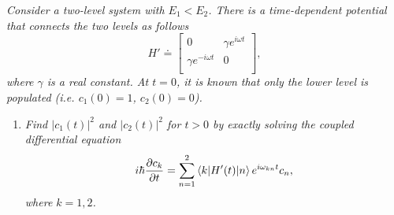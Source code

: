 \begin{example}
	\emph{Consider a two-level system with $E_1<E_2$. There is a time-dependent potential that connects the two levels as follows}
	\begin{equation}
		H'\doteq\begin{bmatrix}
			0 & \gamma e^{i\omega t} \\
			\gamma e^{-i\omega t} & 0\\
		\end{bmatrix},
	\end{equation} 	
	\emph{where $\gamma$ is a real constant. At $t=0$, it is known that only the lower level is populated (i.e. $c_1(0)=1$, $c_2(0)=0$).}\newline
	
	\begin{enumerate}
		\item \emph{Find $|c_1(t)|^2$ and $|c_2(t)|^2$ for $t>0$ by exactly solving the coupled differential equation}
		\begin{equation}
			i\hbar\frac{\partial c_k}{\partial t}=\sum_{n=1}^{2}\braket{k|H'(t)|n}e^{i\omega_{kn}t}c_n,
		\end{equation}		
		\emph{where $k=1,2$.}\newline
		

\end{enumerate}
\end{example}
